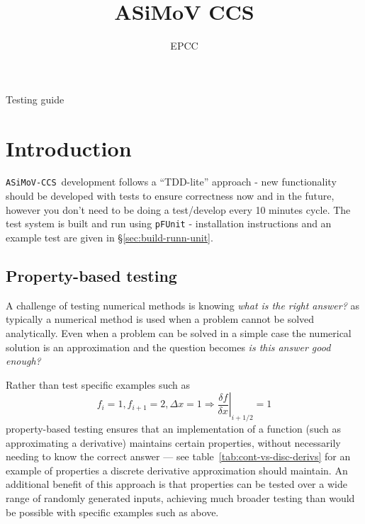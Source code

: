 \documentclass[11pt]{article}
\newcommand{\accs}{\texttt{ASiMoV-CCS}}
\begin{document}
\lstset{style=codefragment}

\title{ASiMoV CCS}

\author{EPCC}

\makeEPCCtitle

\centerline{\sc Testing guide}

\tableofcontents
\pagebreak

\bigskip


\bigskip


\section{Introduction}

\accs\ development follows a ``TDD-lite'' approach - new functionality should be developed with
tests to ensure correctness now and in the future, however you don't need to be doing a test/develop
every 10 minutes cycle.
The test system is built and run using \texttt{pFUnit} - installation instructions and an example
test are given in \S\ref{sec:build-runn-unit}.


\subsection{Property-based testing}
\label{subsec:prop-based-test}

A challenge of testing numerical methods is knowing \textit{what is the right answer?} as typically
a numerical method is used when a problem cannot be solved analytically.
Even when a problem can be solved in a simple case the numerical solution is an approximation and
the question becomes \textit{is this answer good enough?}

Rather than test specific examples such as
\begin{equation}
  f_i=1, f_{i+1}=2, \Delta{}x=1 \Rightarrow \left. \frac{\delta f}{\delta x} \right|_{i+1/2} = 1
\end{equation}
property-based testing ensures that an implementation of a function (such as approximating a
derivative) maintains certain properties, without necessarily needing to know the correct answer ---
see table~\ref{tab:cont-vs-disc-derivs} for an example of properties a discrete derivative
approximation should maintain.
An additional benefit of this approach is that properties can be tested over a wide range of
randomly generated inputs, achieving much broader testing than would be possible with specific
examples such as above.
\end{document}
